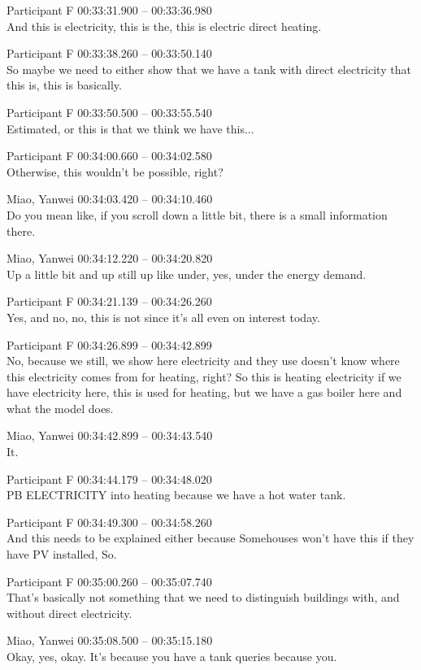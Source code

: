 {Participant F 00:33:31.900 -- 00:33:36.980 \\
And this is electricity, this is the, this is electric direct heating.

Participant F 00:33:38.260 -- 00:33:50.140 \\
So maybe we need to either show that we have a tank with direct electricity that this is, this is basically.

Participant F 00:33:50.500 -- 00:33:55.540 \\
Estimated, or this is that we think we have this...

Participant F 00:34:00.660 -- 00:34:02.580 \\
Otherwise, this wouldn't be possible, right?

Miao, Yanwei 00:34:03.420 -- 00:34:10.460 \\
Do you mean like, if you scroll down a little bit, there is a small information there.

Miao, Yanwei 00:34:12.220 -- 00:34:20.820 \\
Up a little bit and up still up like under, yes, under the energy demand.

Participant F 00:34:21.139 -- 00:34:26.260 \\
Yes, and no, no, this is not since it's all even on interest today.

Participant F 00:34:26.899 -- 00:34:42.899 \\
No, because we still, we show here electricity and they use doesn't know where this electricity comes from for heating, right? So this is heating electricity if we have electricity here, this is used for heating, but we have a gas boiler here and what the model does.

Miao, Yanwei 00:34:42.899 -- 00:34:43.540 \\
It.

Participant F 00:34:44.179 -- 00:34:48.020 \\
PB ELECTRICITY into heating because we have a hot water tank.

Participant F 00:34:49.300 -- 00:34:58.260 \\
And this needs to be explained either because Somehouses won't have this if they have PV installed, So.

Participant F 00:35:00.260 -- 00:35:07.740 \\
That's basically not something that we need to distinguish buildings with, and without direct electricity.

Miao, Yanwei 00:35:08.500 -- 00:35:15.180 \\
Okay, yes, okay. It's because you have a tank queries because you.

}
